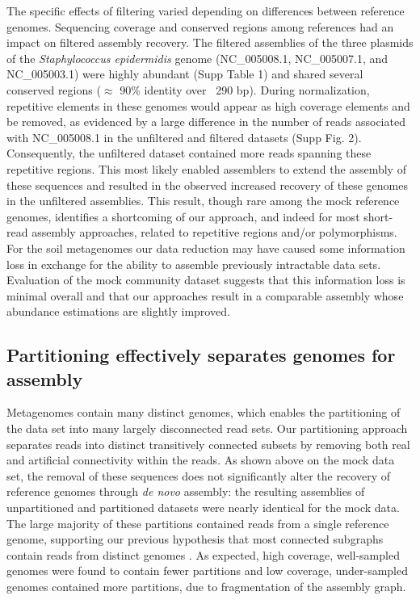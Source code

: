 \documentclass[11pt]{article} %
\begin{document}
The specific effects of filtering varied depending on differences
between reference genomes.  Sequencing coverage and conserved regions
among references had an impact on filtered assembly recovery.  The
filtered assemblies of the three plasmids of the \emph{Staphylococcus
  epidermidis} genome (NC\_005008.1, NC\_005007.1, and NC\_005003.1)
were highly abundant (Supp Table 1) and shared several conserved
regions ($\approx$ 90\% identity over ~290 bp).  During normalization,
repetitive elements in these genomes would appear as high coverage
elements and be removed, as evidenced by a large difference in the
number of reads associated with NC\_005008.1 in the unfiltered and
filtered datasets (Supp Fig. 2). Consequently, the unfiltered dataset
contained more reads spanning these repetitive regions.  This most
likely enabled assemblers to extend the assembly of these sequences
and resulted in the observed increased recovery of these genomes in
the unfiltered assemblies. This result, though rare among the mock
reference genomes, identifies a shortcoming of our approach, and
indeed for most short-read assembly approaches, related to repetitive
regions and/or polymorphisms.  For the soil metagenomes our data
reduction may have caused some information loss in exchange for the
ability to assemble previously intractable data sets.  Evaluation of
the mock community dataset suggests that this information loss is
minimal overall and that our approaches result in a comparable
assembly whose abundance estimations are slightly improved.

\subsection{Partitioning effectively separates genomes for assembly}

Metagenomes contain many distinct genomes, which enables the
partitioning of the data set into many largely disconnected read sets.
Our partitioning approach separates reads into distinct transitively
connected subsets by removing both real and artificial connectivity
within the reads.  As shown above on the mock data set, the removal of
these sequences does not significantly alter the recovery of reference
genomes through {\em de novo} assembly: the resulting assemblies of
unpartitioned and partitioned datasets were nearly identical for the
mock data.  The large majority of these partitions contained reads
from a single reference genome, supporting our previous hypothesis
that most connected subgraphs contain reads from distinct genomes
\cite{Pell:2012cq}.  As expected, high coverage, well-sampled genomes
were found to contain fewer partitions and low coverage, under-sampled genomes contained more partitions, due to fragmentation of the assembly graph.
\end{document}
